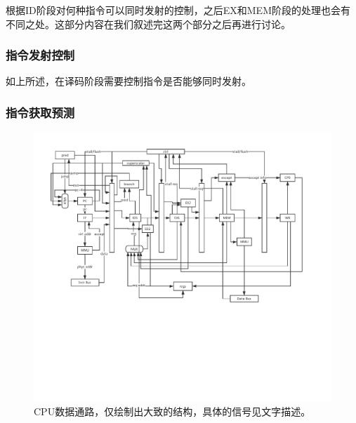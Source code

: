 根据ID阶段对何种指令可以同时发射的控制，之后EX和MEM阶段的处理也会有不同之处。这部分内容在我们叙述完这两个部分之后再进行讨论。

\subsubsection{指令发射控制}
如上所述，在译码阶段需要控制指令是否能够同时发射。

\subsubsection{指令获取预测}

\begin{landscape}
\begin{figure}[htbp]
	\centering
	\includegraphics[width=\linewidth]{datapath.pdf}
	\caption{CPU数据通路，仅绘制出大致的结构，具体的信号见文字描述。}
	\label{fig:cpu-datapath}
\end{figure}
\end{landscape}
